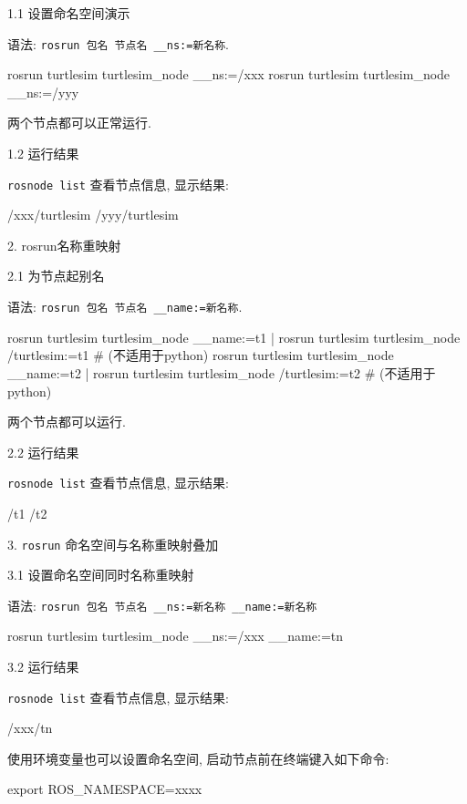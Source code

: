 \documentclass[openany, fontset=windowsold]{ctexbook}
\theoremstyle{kaiti}
\theoremstyle{normal}
\begin{document}
1.1 设置命名空间演示

语法: \verb|rosrun 包名 节点名 __ns:=新名称|.

\begin{bash}
  rosrun turtlesim turtlesim_node __ns:=/xxx
  rosrun turtlesim turtlesim_node __ns:=/yyy
\end{bash}

两个节点都可以正常运行.

1.2 运行结果

\verb|rosnode list| 查看节点信息, 显示结果:

\begin{bash}
  /xxx/turtlesim
  /yyy/turtlesim
\end{bash}

2. rosrun名称重映射

2.1 为节点起别名

语法: \verb|rosrun 包名 节点名 __name:=新名称|.

\begin{bash}
  rosrun turtlesim  turtlesim_node __name:=t1 |  rosrun turtlesim   turtlesim_node /turtlesim:=t1 # (不适用于python)
  rosrun turtlesim  turtlesim_node __name:=t2 |  rosrun turtlesim   turtlesim_node /turtlesim:=t2 # (不适用于python)
\end{bash}

两个节点都可以运行.

2.2 运行结果

\verb|rosnode list| 查看节点信息, 显示结果:

\begin{bash}
  /t1
  /t2
\end{bash}

3. \verb|rosrun| 命名空间与名称重映射叠加

3.1 设置命名空间同时名称重映射

语法: \verb|rosrun 包名 节点名 __ns:=新名称 __name:=新名称|

\begin{bash}
  rosrun turtlesim turtlesim_node __ns:=/xxx __name:=tn
\end{bash}

3.2 运行结果

\verb|rosnode list| 查看节点信息, 显示结果:

\begin{bash}
  /xxx/tn
\end{bash}

使用环境变量也可以设置命名空间, 启动节点前在终端键入如下命令:

\begin{bash}
  export ROS_NAMESPACE=xxxx
\end{bash}
\end{document}
